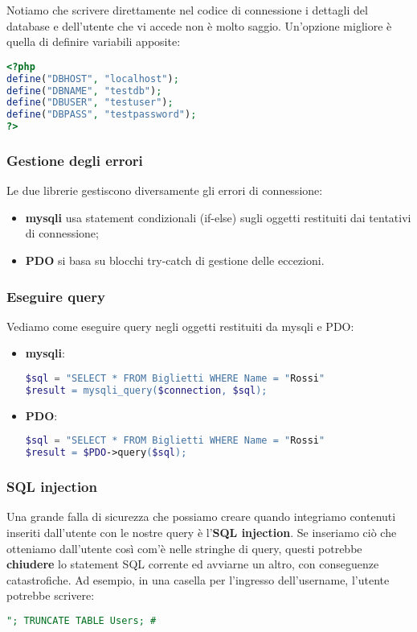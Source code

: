 \documentclass[a4paper,11pt]{article}
\begin{document}
Notiamo che scrivere direttamente nel codice di connessione i dettagli del database e dell'utente che vi accede non è molto saggio.
Un'opzione migliore è quella di definire variabili apposite:
\begin{lstlisting}[language=php, style=codestyle]	
<?php
define("DBHOST", "localhost");
define("DBNAME", "testdb");
define("DBUSER", "testuser");
define("DBPASS", "testpassword");
?>
\end{lstlisting}

\subsubsection{Gestione degli errori}
Le due librerie gestiscono diversamente gli errori di connessione:
\begin{itemize}
	\item \textbf{mysqli} usa statement condizionali (if-else) sugli oggetti restituiti dai tentativi di connessione;
	\item \textbf{PDO} si basa su blocchi try-catch di gestione delle eccezioni.
\end{itemize}

\subsubsection{Eseguire query}
Vediamo come eseguire query negli oggetti restituiti da mysqli e PDO:
\begin{itemize}
	\item \textbf{mysqli}:
\begin{lstlisting}[language=php, style=codestyle]	
$sql = "SELECT * FROM Biglietti WHERE Name = "Rossi"
$result = mysqli_query($connection, $sql);
\end{lstlisting}
	\item \textbf{PDO}:
\begin{lstlisting}[language=php, style=codestyle]	
$sql = "SELECT * FROM Biglietti WHERE Name = "Rossi"
$result = $PDO->query($sql);
\end{lstlisting}
\end{itemize}

\subsubsection{SQL injection}
Una grande falla di sicurezza che possiamo creare quando integriamo contenuti inseriti dall'utente con le nostre query è l'\textbf{SQL injection}.
Se inseriamo ciò che otteniamo dall'utente così com'è nelle stringhe di query, questi potrebbe \textbf{chiudere} lo statement SQL corrente ed avviarne un altro, con conseguenze catastrofiche.
Ad esempio, in una casella per l'ingresso dell'username, l'utente potrebbe scrivere:
\begin{lstlisting}[language=SQL, style=codestyle]	
"; TRUNCATE TABLE Users; #
\end{lstlisting}
\end{document}
